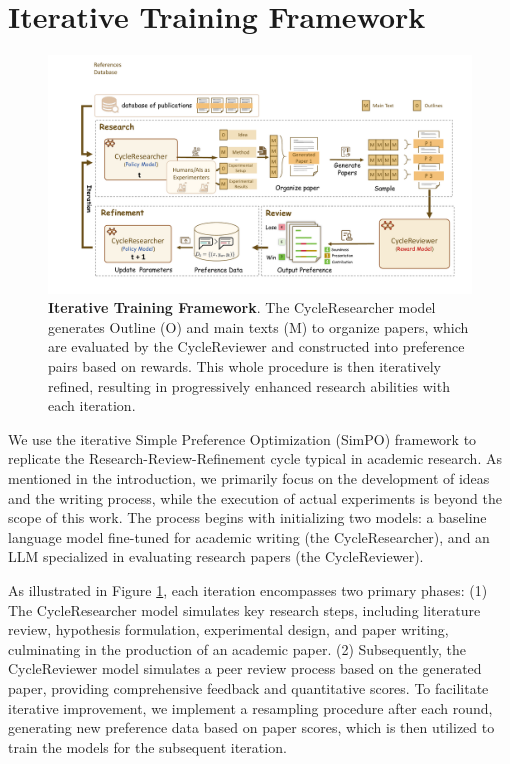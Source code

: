 \documentclass{article} %
\begin{document}
\section{Iterative Training Framework}
\begin{figure}[t]
    \centering
    \includegraphics[width=.9\textwidth]{method_figure.pdf}
    \vspace{-0.25cm}
    \caption{\textbf{Iterative Training Framework}. The CycleResearcher model generates Outline (O) and main texts (M) to organize papers, which are evaluated by the CycleReviewer and constructed into preference pairs based on rewards. This whole procedure is then iteratively refined, resulting in progressively enhanced research abilities with each iteration.}
    \vspace{-0.4cm}
    \label{fig:method}
\end{figure}

We use the iterative Simple Preference Optimization (SimPO) \citep{meng2024simposimplepreferenceoptimization} framework to replicate the Research-Review-Refinement cycle typical in academic research. As mentioned in the introduction, we primarily focus on the development of ideas and the writing process, while the execution of actual experiments \citep{liu2024towards,zhu2024mossenablingcodedrivenevolution,Hu2024AutomatedDO} is beyond the scope of this work. The process begins with initializing two models: a baseline language model fine-tuned for academic writing (the CycleResearcher), and an LLM specialized in evaluating research papers (the CycleReviewer).

As illustrated in Figure \ref{fig:method}, each iteration encompasses two primary phases: (1) The CycleResearcher model simulates key research steps, including literature review, hypothesis formulation, experimental design, and paper writing, culminating in the production of an academic paper. (2) Subsequently, the CycleReviewer model simulates a peer review process based on the generated paper, providing comprehensive feedback and quantitative scores. To facilitate iterative improvement, we implement a resampling procedure after each round, generating new preference data based on paper scores, which is then utilized to train the models for the subsequent iteration. 
\end{document}

